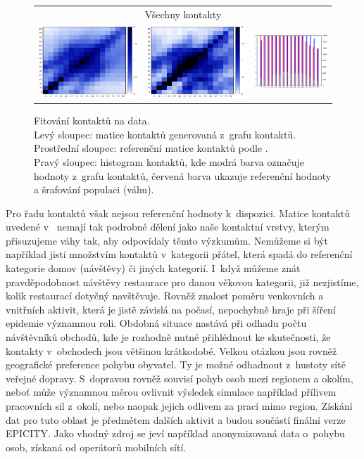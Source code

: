 \begin{figure}
\begin{center}
\begin{tabular}{|ccc|}
      \hline
      \multicolumn{3}{|c|}{Všechny kontakty} \\        
      \includegraphics[width=38mm]{pic/all_mat.eps} &
      \includegraphics[width=38mm]{pic/all_mat_ref.eps} &
      \includegraphics[width=28mm]{pic/all.eps}\\
      \hline

\end{tabular}
\end{center}
\caption{Fitování kontaktů na data.  \\ Levý sloupec: matice kontaktů generovaná z~grafu kontaktů. \\ Prostřední sloupec: referenční matice kontaktů podle \cite{Prem_etal2017}. \\ Pravý sloupec: histogram kontaktů, kde modrá barva označuje hodnoty z~grafu kontaktů, červená barva ukazuje referenční hodnoty a šrafování populaci (váhu).}
\label{maticekontaktu}
\end{figure}

Pro řadu kontaktů však nejsou referenční hodnoty k~dispozici. Matice kontaktů uvedené v~\cite{Prem_etal2017} nemají tak podrobné dělení jako naše kontaktní vrstvy, kterým přisuzujeme váhy tak, aby odpovídaly těmto výzkumům. Nemůžeme si být například jisti množstvím kontaktů v~kategorii přátel, která spadá do referenční kategorie domov (návštěvy) či jiných kategorií. I~když můžeme znát pravděpodobnost návštěvy restaurace pro danou věkovou kategorii, již nezjistíme, kolik restaurací dotyčný navštěvuje. Rovněž znalost poměru venkovních a vnitřních aktivit, která je jistě závislá na počasí, nepochybně hraje při šíření epidemie významnou roli. Obdobná situace nastává při odhadu počtu návštěvníků obchodů, kde je rozhodně nutné přihlédnout ke skutečnosti, že kontakty v~obchodech jsou většinou krátkodobé.
Velkou otázkou jsou rovněž geografické preference pohybu obyvatel. Ty je možné odhadnout z~hustoty sítě veřejné dopravy. S~dopravou rovněž souvisí pohyb osob mezi regionem a okolím, neboť může významnou měrou ovlivnit výsledek simulace například přílivem pracovních sil z~okolí, nebo naopak jejich odlivem za prací mimo region. Získání dat pro tuto oblast je předmětem dalších aktivit a budou součástí finální verze EPICITY. Jako vhodný zdroj se jeví například anonymizovaná data o~pohybu osob, získaná od operátorů mobilních sítí. 

